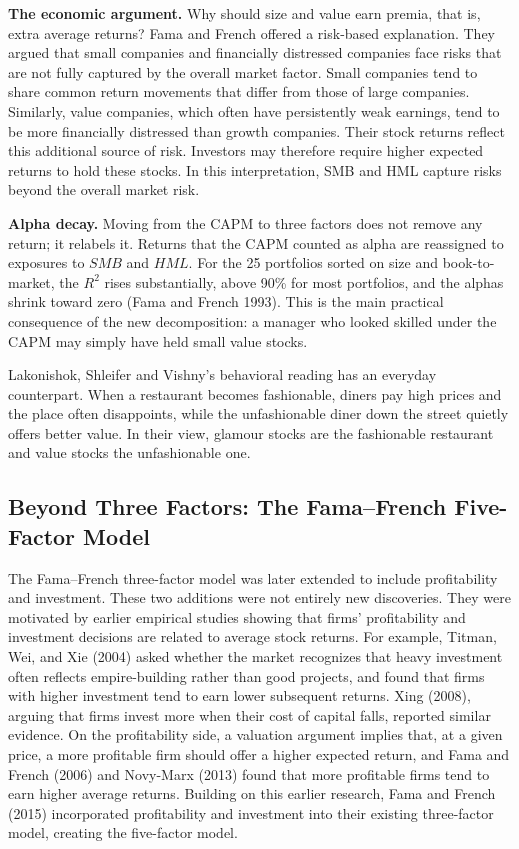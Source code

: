 \textbf{The economic argument.} Why should size and value earn premia, that is, extra average returns? 
Fama and French offered a risk-based explanation. They argued that small companies and financially distressed companies face risks that are not fully captured by the overall market factor. Small companies tend to share common return movements that differ from those of large companies. Similarly, value companies, which often have persistently weak earnings, tend to be more financially distressed than growth companies. Their stock returns reflect this additional source of risk. Investors may therefore require higher expected returns to hold these stocks. In this interpretation, SMB and HML capture risks beyond the overall market risk.

\textbf{Alpha decay.} Moving from the CAPM to three factors does not remove any return; it relabels it. Returns that the CAPM counted as alpha are reassigned to exposures to $SMB$ and $HML$. For the 25 portfolios sorted on size and book-to-market, the $R^2$ rises substantially, above 90\% for most portfolios, and the alphas shrink toward zero (Fama and French 1993). This  is the main practical consequence of the new decomposition: a manager who looked skilled under the CAPM may simply have held small value stocks.

Lakonishok, Shleifer and Vishny's behavioral reading has an everyday counterpart. When a restaurant becomes fashionable, diners pay high prices and the place often disappoints, while the unfashionable diner down the street quietly offers better value. In their view, glamour stocks are the fashionable restaurant and value stocks the unfashionable one.


\subsection{Beyond Three Factors: The Fama--French Five-Factor Model}
\label{sec:04-multifactor}

The Fama--French three-factor model was later extended to include profitability and investment. These two additions were not entirely new
discoveries. They were motivated by earlier empirical studies showing that firms' profitability and investment decisions are related to
average stock returns. For example, Titman, Wei, and Xie (2004) asked whether the market recognizes that heavy investment often reflects empire-building rather than
good projects, and found that firms with higher investment tend to earn lower subsequent returns. Xing (2008), arguing that firms invest more
when their cost of capital falls, reported similar evidence. On the profitability side, a valuation argument implies that, at a given price, a more
profitable firm should offer a higher expected return, and Fama and French (2006) and Novy-Marx (2013) found that more
profitable firms tend to earn higher average returns. Building on this earlier research, Fama and French (2015) incorporated profitability
and investment into their existing three-factor model, creating the five-factor model.

